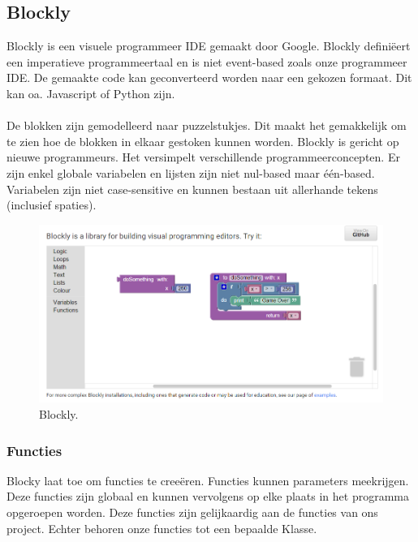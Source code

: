 \documentclass[]{article}
\begin{document}
\subsection{Blockly}
Blockly \cite{blockly} is een visuele programmeer IDE gemaakt door Google. Blockly defini\"{e}ert een imperatieve programmeertaal en is niet event-based zoals onze programmeer IDE. De gemaakte code kan geconverteerd worden naar een gekozen formaat. Dit kan oa. Javascript of Python zijn. \\\\
De blokken zijn gemodelleerd naar puzzelstukjes. Dit maakt het gemakkelijk om te zien hoe de blokken in elkaar gestoken kunnen worden. Blockly is gericht op nieuwe programmeurs. Het versimpelt verschillende programmeerconcepten. Er zijn enkel globale variabelen en lijsten zijn niet nul-based maar \'{e}\'{e}n-based. Variabelen zijn niet case-sensitive en kunnen bestaan uit allerhande tekens (inclusief spaties).
\begin{figure}
\centering
\includegraphics[width=1.2\textwidth]{./BestaandeSoftware/blockly.PNG}
\caption{Blockly.}
\end{figure}
\subsubsection{Functies}
Blocky laat toe om functies te cree\"{e}ren. Functies kunnen parameters meekrijgen. Deze functies zijn globaal en kunnen vervolgens op elke plaats in het programma opgeroepen worden. Deze functies zijn gelijkaardig aan de functies van ons project. Echter behoren onze functies tot een bepaalde Klasse.
\end{document}
